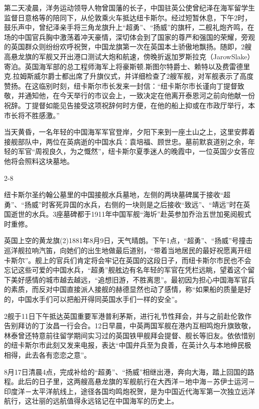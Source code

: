 \documentclass[12pt,UTF8]{ctexbook}
\begin{document}
第二天凌晨，洋务运动领导人物曾国藩的长子，中国驻英公使曾纪泽在海军留学生监督日意格等的陪同下，从伦敦乘火车抵达纽卡斯尔。经过短暂休息，下午2时，鼓乐声中，曾纪泽亲手将三角龙旗升上“超勇”、“扬威”的旗杆，二舰礼炮齐鸣，在场的中国官兵胸中激荡着冲天豪情，深切体会到了国家的尊严和强国的荣耀，旁观的英国群众则纷纷欢呼祝贺，中国龙旗第一次在英国本土骄傲地飘扬。随即，2艘高悬龙旗的军舰又开出港口测试大炮和航速，傍晚折返加罗斯拉克（JarowSlake）寄泊。英国海军部的总工程师海军上将豪斯顿.斯图尔特爵士、赖特以及费雷德里克.拉姆斯威尔爵士都出席了升旗仪式，并详细检查了2艘军舰，对军舰表示了高度赞扬。在这临别时刻，纽卡斯尔市长发来一封信：“纽卡斯尔市长谨向丁提督致敬，并通知他，在今天举行的市议会上，一致决定在他离开泰恩河之前向他献一份祝辞。丁提督如能见告接受这项祝辞何时方便，在他的船上抑或在市政厅举行，本市长将不胜感激。”

当天黄昏，一名年轻的中国海军军官登岸，夕阳下来到一座土山之上，这里安葬着接舰部队中，两位在英病逝的中国水兵：袁培福、顾世忠。墓前默哀道别之余，年轻的军官“周视良久，为之慨然”，纽卡斯尔夏季迷人的晚霞中，一位英国少女答应他将会照料这块墓地。

2-8

纽卡斯尔圣约翰公墓里的中国接舰水兵墓地，左侧的两块墓碑属于接收“超勇”、“扬威”时客死异国的水兵，右侧的一块则是之后接收“致远”、“靖远”时在英国逝世的水兵。3座墓碑都于1911年中国军舰“海圻”赴英参加乔治五世加冕阅舰式时重修。

英国上空的黄龙旗(2)1881年8月9日，天气晴朗。下午1点，“超勇”、“扬威”号撞击巡洋舰拉响汽笛，向她们的出生地做最后道别，“带着当地居民的最好祝愿离开纽卡斯尔”。舰上的官兵们肯定将会牢记在英国的这段日子，而纽卡斯尔市民也不会忘记这些可爱的中国水兵，“超勇”舰舷边有名年轻的军官在凭栏远眺，望着这个留下美好感情的城市越去越远，“追想旧游，不胜离思”。最初因为担心中国海军官兵的素质，而反对中国直接派人接舰的赫德显然也动了感情，称“如果船的质量是好的，中国水手们可以把船开得同英国水手们一样的安全”。

2舰于11日下午抵达英国重要军港普利茅斯，进行礼节性拜会，并与之前赴伦敦作告别拜访的丁汝昌一行会合。12日早晨，中英两国军舰在港内互相鸣炮升旗致敬，林泰曾还特意前往留学期间实习过的英国铁甲舰拜会提督、舰长等旧友。依依惜别的纽卡斯尔市此刻又发来电报，表达“中国弁兵至为良善，在英计久与本地绅民极相得，此去各有恋恋之意”。

8月17日清晨4点，完成补给的“超勇”、“扬威”相继出港，奔向大海，踏上回国的路程。此后的日子里，这两艘高悬龙旗的军舰航行在大西洋－地中海－苏伊士运河－印度洋－太平洋航线上，途径各国均鸣炮祝贺，是为中国近代海军第一次独立远洋航行，这壮丽的远航值得永远铭记在中国海军的历史上。
\end{document}
